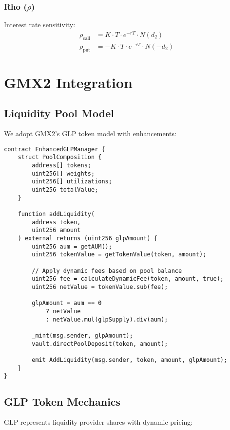\documentclass[11pt,a4paper]{article}
\begin{document}
\subsubsection{Rho ($\rho$)}
Interest rate sensitivity:
\begin{align}
\rho_{\text{call}} &= K \cdot T \cdot e^{-rT} \cdot N(d_2) \\
\rho_{\text{put}} &= -K \cdot T \cdot e^{-rT} \cdot N(-d_2)
\end{align}

\section{GMX2 Integration}

\subsection{Liquidity Pool Model}

We adopt GMX2's GLP token model with enhancements:

\begin{lstlisting}[caption={Enhanced GLP Manager}]
contract EnhancedGLPManager {
    struct PoolComposition {
        address[] tokens;
        uint256[] weights;
        uint256[] utilizations;
        uint256 totalValue;
    }

    function addLiquidity(
        address token,
        uint256 amount
    ) external returns (uint256 glpAmount) {
        uint256 aum = getAUM();
        uint256 tokenValue = getTokenValue(token, amount);

        // Apply dynamic fees based on pool balance
        uint256 fee = calculateDynamicFee(token, amount, true);
        uint256 netValue = tokenValue.sub(fee);

        glpAmount = aum == 0
            ? netValue
            : netValue.mul(glpSupply).div(aum);

        _mint(msg.sender, glpAmount);
        vault.directPoolDeposit(token, amount);

        emit AddLiquidity(msg.sender, token, amount, glpAmount);
    }
}
\end{lstlisting}

\subsection{GLP Token Mechanics}

GLP represents liquidity provider shares with dynamic pricing:
\end{document}
